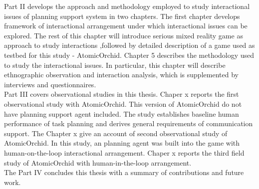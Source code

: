 Part II develops the approach and methodology employed to study interactional issues of planning support system in two chapters. The first chapter develops framework of interactional arrangement under which interactional issues can be explored. The rest of this chapter will introduce serious mixed reality game as approach to study interactions  ,followed by detailed description of a game used as testbed for this study - AtomicOrchid. Chapter 5 describes the methodology used to study the interactional issues. In particular, this chapter will describe ethnographic observation and interaction analysis, which is supplemented by interviews and questionnaires. \\ 

Part III covers observational studies in this thesis. Chaper x reports the first observational study with AtomicOrchid. This version of AtomicOrchid do not have planning support agent included. The study establishes baseline human performance of task planning and derives general requirements of communication support. The Chapter x give an account of second observational study of AtomicOrchid. In this study, an planning agent was built into the game with human-on-the-loop interactional arrangement. Chaper x reports the third field study of AtomicOrchid with human-in-the-loop arrangement. \\ 

The Part IV concludes this thesis with a summary of contributions and future work.\\









